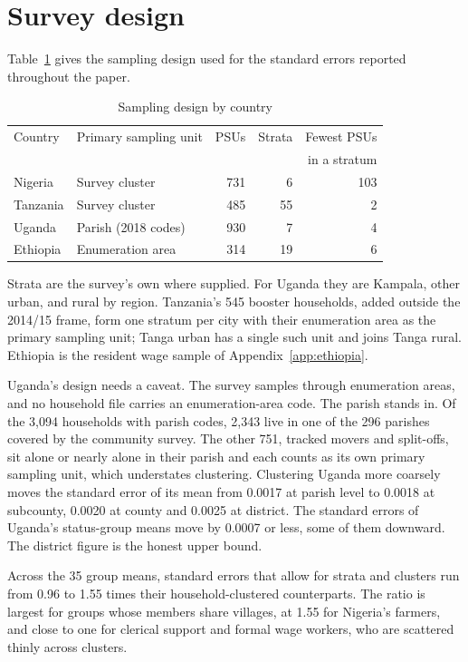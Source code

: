 \section{Survey design}
\label{app:design}

Table~\ref{tab:design} gives the sampling design used for the standard errors
reported throughout the paper.

\begin{table}[ht]
\centering
\caption{Sampling design by country}
\label{tab:design}
\small
\begin{tabular}{llrrr}
\toprule
Country & Primary sampling unit & PSUs & Strata & Fewest PSUs \\
        &                       &      &        & in a stratum \\
\midrule
Nigeria       & Survey cluster          & 731 & 6  & 103 \\
Tanzania      & Survey cluster          & 485 & 55 & 2 \\
Uganda        & Parish (2018 codes)     & 930 & 7  & 4 \\
Ethiopia      & Enumeration area        & 314 & 19 & 6 \\
\bottomrule
\end{tabular}

\vspace{4pt}
\begin{minipage}{0.94\linewidth}
\footnotesize
Strata are the survey's own where supplied. For Uganda they are Kampala, other
urban, and rural by region. Tanzania's 545 booster households, added outside the
2014/15 frame, form one stratum per city with their enumeration area as the
primary sampling unit; Tanga urban has a single such unit and joins Tanga rural.
Ethiopia is the resident wage sample of Appendix~\ref{app:ethiopia}.
\end{minipage}
\end{table}

Uganda's design needs a caveat. The survey samples through enumeration areas,
and no household file carries an enumeration-area code. The parish stands in.
Of the 3,094 households with parish codes, 2,343 live in one of the 296 parishes
covered by the community survey. The other 751, tracked movers and split-offs,
sit alone or nearly alone in their parish and each counts as its own primary
sampling unit, which understates clustering. Clustering Uganda more coarsely
moves the standard error of its mean from 0.0017 at parish level to 0.0018 at
subcounty, 0.0020 at county and 0.0025 at district. The standard errors of
Uganda's status-group means move by 0.0007 or less, some of them downward. The
district figure is the honest upper bound.

Across the 35 group means, standard errors that allow for strata and clusters run from 0.96 to 1.55
times their household-clustered counterparts. The ratio is largest for groups
whose members share villages, at 1.55 for Nigeria's farmers, and close to one
for clerical support and formal wage workers, who are scattered thinly across
clusters.
